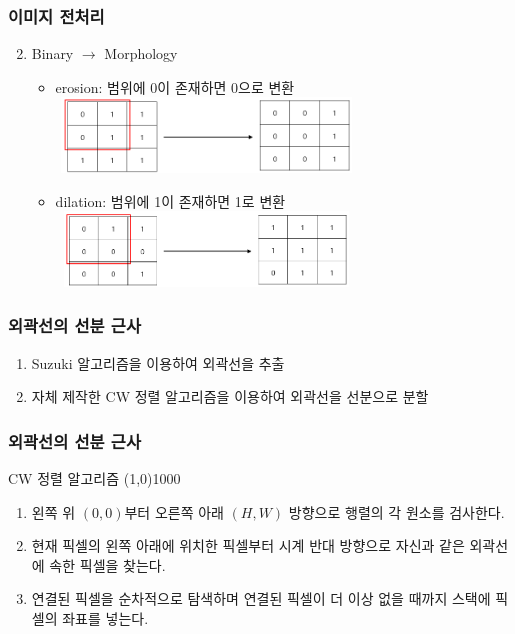 \documentclass{beamer}
\begin{document}
	\begin{frame}{}
		\frametitle{이미지 전처리}
		\begin{enumerate}
			\setcounter{enumi}{1}
			\item Binary $ \rightarrow $ Morphology
			\begin{itemize}
				\item erosion: 범위에 0이 존재하면 0으로 변환 \\
				\vspace{0.5em}
				\includegraphics[width=8cm, height=2cm]{Erosion.png}
				\item dilation: 범위에 1이 존재하면 1로 변환 \\
				\vspace{0.5em}
				\includegraphics[width=8cm, height=2cm]{Dilation.png}
			\end{itemize}
		\end{enumerate}	
	\end{frame}
	\begin{frame}{}
		\frametitle{외곽선의 선분 근사}
		\begin{enumerate}
			\item Suzuki 알고리즘을 이용하여 외곽선을 추출\cite{suzuki}
			\item 자체 제작한 CW 정렬 알고리즘을 이용하여 외곽선을 선분으로 분할
		\end{enumerate}	
	\end{frame}
	\begin{frame}{}
		\frametitle{외곽선의 선분 근사}
		CW 정렬 알고리즘
		\line(1,0){1000}
		\begin{enumerate}
			\item 왼쪽 위 $(0, 0)$부터 오른쪽 아래 $(H, W)$ 방향으로 행렬의 각 원소를 검사한다. \label{CW1}
			\item 현재 픽셀의 왼쪽 아래에 위치한 픽셀부터 시계 반대 방향으로 자신과 같은 외곽선에 속한 픽셀을 찾는다. \label{CW2}
			\item 연결된 픽셀을 순차적으로 탐색하며 연결된 픽셀이 더 이상 없을 때까지 스택에 픽셀의 좌표를 넣는다.
		\end{enumerate}
	\end{frame}
\end{document}
